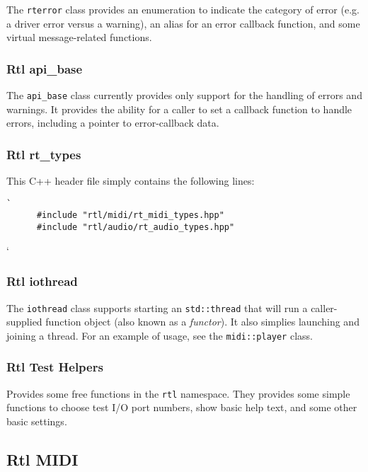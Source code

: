    The \texttt{rterror} class provides an enumeration to indicate the
   category of error (e.g. a driver error versus a warning),
   an alias for an error callback function, and some virtual message-related
   functions.

\subsubsection{Rtl api\_base}
\label{subsubsec:rtl_api_base}

   The \texttt{api\_base} class currently provides only support for
   the handling of errors and warnings.
   It provides the ability for a caller to set a callback function to
   handle errors, including a pointer to error-callback data.

\subsubsection{Rtl rt\_types}
\label{subsubsec:rtl_rt_types}

   This C++ header file simply contains the following lines:

   \begin{verbatim}`
      #include "rtl/midi/rt_midi_types.hpp"
      #include "rtl/audio/rt_audio_types.hpp"
   \end{verbatim}`

\subsubsection{Rtl iothread}
\label{subsubsec:rtl_iothread}

   The \texttt{iothread} class supports starting an
   \texttt{std::thread} that will run a caller-supplied function object
   (also known as a \textsl{functor}).
   It also simplies launching and joining a thread.
   For an example of usage, see the \texttt{midi::player} class.

\subsubsection{Rtl Test Helpers}
\label{subsubsec:rtl_test_helpers}

   Provides some free functions in the \texttt{rtl} namespace.
   They provides some simple functions to choose test I/O port numbers,
   show basic help text, and some other basic settings.

\subsection{Rtl MIDI}
\label{subsec:rtl_midi}


